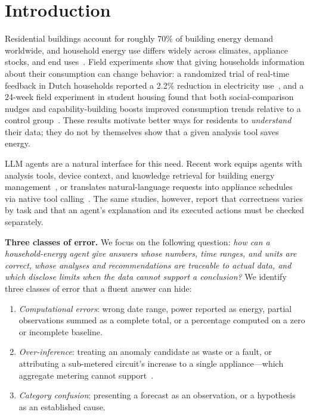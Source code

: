 \documentclass[conference]{IEEEtran}
\begin{document}
\section{Introduction}

Residential buildings account for roughly 70\% of building energy
demand worldwide, and household energy use differs widely across
climates, appliance stocks, and end uses~\cite{iea2025efficiency}.
Field experiments show that giving households information about their
consumption can change behavior: a randomized trial of real-time
feedback in Dutch households reported a 2.2\% reduction in electricity
use~\cite{boomsma2025feedback}, and a 24-week field experiment in
student housing found that both social-comparison nudges and
capability-building boosts improved consumption trends relative to a
control group~\cite{paunov2026nudges}. These results motivate better
ways for residents to \emph{understand} their data; they do not by
themselves show that a given analysis tool saves energy.

LLM agents are a natural interface for this need. Recent work equips
agents with analysis tools, device context, and knowledge retrieval for
building energy management~\cite{he2025contextaware}, or translates
natural-language requests into appliance schedules via native tool
calling~\cite{jonah2026agentic}. The same studies, however, report that
correctness varies by task and that an agent's explanation and its
executed actions must be checked separately.

\textbf{Three classes of error.} We focus on the following question:
\emph{how can a household-energy agent give answers whose numbers,
time ranges, and units are correct, whose analyses and recommendations
are traceable to actual data, and which disclose limits when the data
cannot support a conclusion?} We identify three classes of error that a
fluent answer can hide:
\begin{enumerate}
  \item \emph{Computational errors}: wrong date range, power reported
        as energy, partial observations summed as a complete total,
        or a percentage computed on a zero or incomplete baseline.
  \item \emph{Over-inference}: treating an anomaly candidate as waste
        or a fault, or attributing a sub-metered circuit's increase to a
        single appliance---which aggregate metering cannot
        support~\cite{hart1992nilm}.
  \item \emph{Category confusion}: presenting a forecast as an
        observation, or a hypothesis as an established cause.
\end{enumerate}
\end{document}
